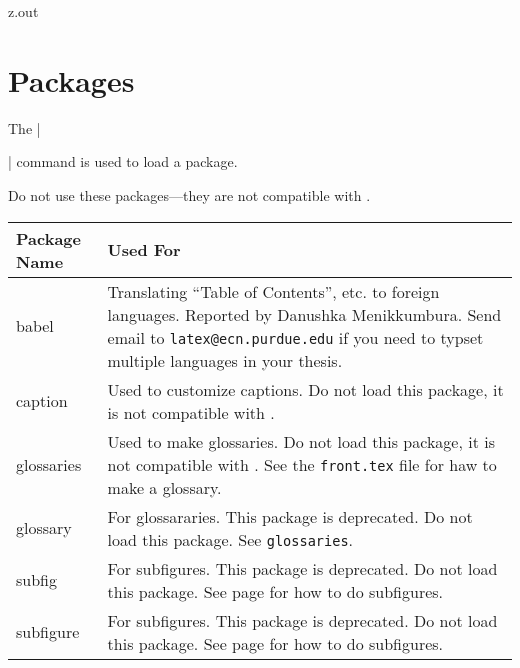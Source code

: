 \begin{VerbatimOut}{z.out}


\section{Packages}

The
|\usepackage{|\Place{packagename}|}|
command is used to load a package.

Do not use these packages---they are not compatible with \PurdueThesisLogo.\\

\noindent
\begin{tabularx}{\textwidth}{@{}lX@{}}
  \toprule
  \bf Package Name& \bf Used For\\
  \midrule
  babel&
    Translating ``Table of Contents'', etc\@. to foreign languages.
    Reported by Danushka Menikkumbura.
    Send email to \verb+latex@ecn.purdue.edu+ if you need to
    typset multiple languages in your thesis.\\
  caption&
    Used to customize captions.
    Do not load this package, it is not compatible with \PurdueThesisLogo.\\
  glossaries&
    Used to make glossaries.
    Do not load this package, it is not compatible with \PurdueThesisLogo.
    See the \verb+front.tex+ file for haw to make a glossary.\\
  glossary&
    For glossararies.
    This package is deprecated.
    Do not load this package.
    See \verb+glossaries+.\\
      subfig&
    For subfigures.
    This package is deprecated.
    Do not load this package.
    See page \pageref{pa:subfigures} for how to do subfigures.\\
  subfigure&
    For subfigures.
    This package is deprecated.
    Do not load this package.
    See page \pageref{pa:subfigures} for how to do subfigures.\\
  \bottomrule
\end{tabularx}
\end{VerbatimOut}

\MyIO

